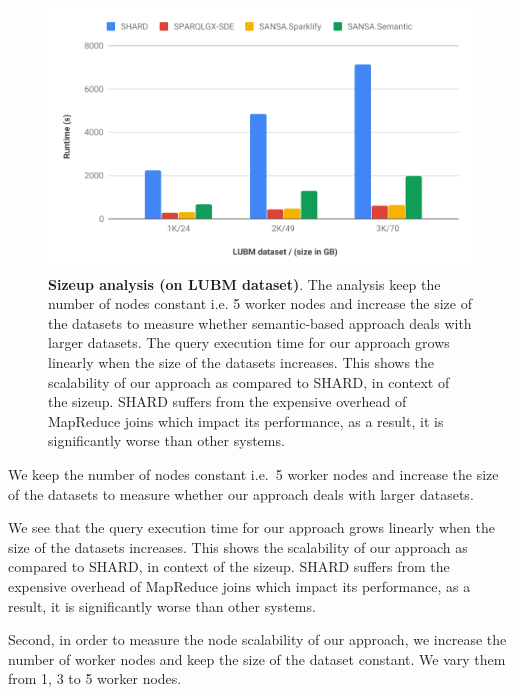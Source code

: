 \begin{figure}
 \includegraphics[width=1.0\columnwidth]{images/6_scalable_rdf_querying/semantic-based-sizeup-scalability.pdf}
    \caption{\textbf{Sizeup analysis (on LUBM dataset)}.
    The analysis keep the number of nodes constant i.e. 5 worker nodes and increase the size of the datasets to measure whether semantic-based approach deals with larger datasets.
    The query execution time for our approach grows linearly when the size of the datasets increases.
    This shows the scalability of our approach as compared to SHARD, in context of the sizeup.
    SHARD suffers from the expensive overhead of MapReduce joins which impact its performance, as a result, it is significantly worse than other systems.
    }
    \label{fig:semantic-based-sizeup-scalability}
\end{figure}

We keep the number of nodes constant i.e.\ 5 worker nodes and increase the size of the datasets to measure whether our approach deals with larger datasets.

We see that the query execution time for our approach grows linearly when the size of the datasets increases.
This shows the scalability of our approach as compared to SHARD, in context of the sizeup.
SHARD suffers from the expensive overhead of MapReduce joins which impact its performance, as a result, it is significantly worse than other systems.

Second, in order to measure the node scalability of our approach, we increase the number of worker nodes and keep the size of the dataset constant.
We vary them from 1, 3 to 5 worker nodes.

